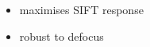 \documentclass[
	25pt,
	a0paper,
	portrait,
	colspace=15mm,
    blockverticalspace=5mm,
]{tikzposter}
\begin{document}
\begin{columns}
{    %

\begin{itemize}[nosep]
    \item maximises SIFT response
    \item robust to defocus
\end{itemize}
}


\end{columns}
\end{document}
